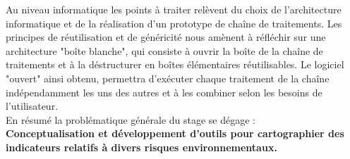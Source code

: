 Au niveau informatique les points à traiter relèvent du choix de l'architecture informatique et de la réalisation d'un prototype de chaîne de traitements. Les principes de réutilisation et de généricité nous amènent à réfléchir sur une architecture "boîte blanche", qui consiste à ouvrir la boîte de la chaîne de traitements et à la déstructurer en boîtes élémentaires réutilisables. Le logiciel "ouvert" ainsi obtenu, permettra d'exécuter chaque traitement de la chaîne indépendamment les uns des autres et à les combiner selon les besoins de l'utilisateur.\\


%
%

En résumé la problématique générale du stage se dégage :\\ \textbf{Conceptualisation et développement d'outils pour cartographier des indicateurs relatifs à divers risques environnementaux.}
%


